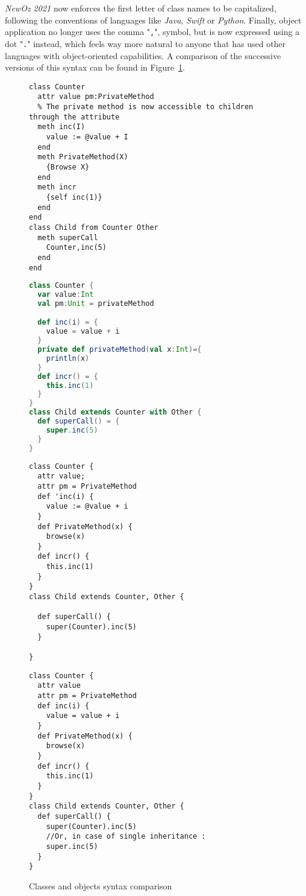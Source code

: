 \textit{NewOz 2021} now enforces the first letter of class names to be capitalized, following the conventions of languages like \textit{Java}, \textit{Swift} or \textit{Python}.
Finally, object application no longer uses the comma "\texttt{,}", symbol, but is now expressed using a dot "\texttt{.}" instead, which feels way more natural to anyone that has used other languages with object-oriented capabilities.
A comparison of the successive versions of this syntax can be found in Figure~\ref{fig:code-comp-obj}.
\begin{figure}
    \noindent\begin{minipage}{.49\textwidth}
\begin{lstlisting}[title={Oz},language=oz]
class Counter
  attr value pm:PrivateMethod
  % The private method is now accessible to children through the attribute
  meth inc(I)
    value := @value + I
  end
  meth PrivateMethod(X)
    {Browse X}
  end
  meth incr
    {self inc(1)}
  end
end
class Child from Counter Other
  meth superCall
    Counter,inc(5)
  end
end
\end{lstlisting}
    \end{minipage}
    \hfill
    \noindent\begin{minipage}{.49\textwidth}
\begin{lstlisting}[title={Scala/Ozma},language=scala]
class Counter {
  var value:Int
  val pm:Unit = privateMethod

  def inc(i) = {
    value = value + i
  }
  private def privateMethod(val x:Int)={
    println(x)
  }
  def incr() = {
    this.inc(1)
  }
}
class Child extends Counter with Other {
  def superCall() = {
    super.inc(5)
  }
}
\end{lstlisting}
    \end{minipage}
    \noindent\begin{minipage}{.49\textwidth}
\begin{lstlisting}[title={NewOz 2020},language=newoz]
class Counter {
  attr value;
  attr pm = PrivateMethod
  def 'inc(i) {
    value := @value + i
  }
  def PrivateMethod(x) {
    browse(x)
  }
  def incr() {
    this.inc(1)
  }
}
class Child extends Counter, Other {

  def superCall() {
    super(Counter).inc(5)
  }

}
\end{lstlisting}
    \end{minipage}
    \hfill
    \noindent\begin{minipage}{.49\textwidth}
\begin{lstlisting}[title={NewOz 2021},language=newoz]
class Counter {
  attr value
  attr pm = PrivateMethod
  def inc(i) {
    value = value + i
  }
  def PrivateMethod(x) {
    browse(x)
  }
  def incr() {
    this.inc(1)
  }
}
class Child extends Counter, Other {
  def superCall() {
    super(Counter).inc(5)
    //Or, in case of single inheritance :
    super.inc(5)
  }
}
\end{lstlisting}
    \end{minipage}
\caption{Classes and objects syntax comparison}
\label{fig:code-comp-obj}
\end{figure}

